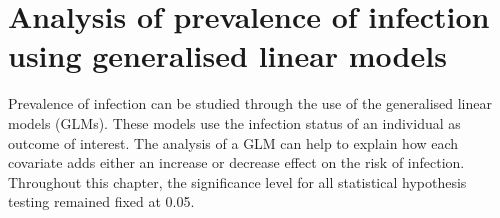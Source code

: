 \chapter[Analysis of prevalence of infection using generalised linear models]{Analysis of prevalence of infection using generalised linear models}
\label{ch:4.0}

Prevalence of infection can be studied through the use of the generalised linear models (GLMs).
These models use the infection status of an individual as outcome of interest.
The analysis of a GLM can help to explain how each covariate adds either an increase or decrease effect on the risk of infection.
Throughout this chapter, the significance level for all statistical hypothesis testing remained fixed at 0.05.



